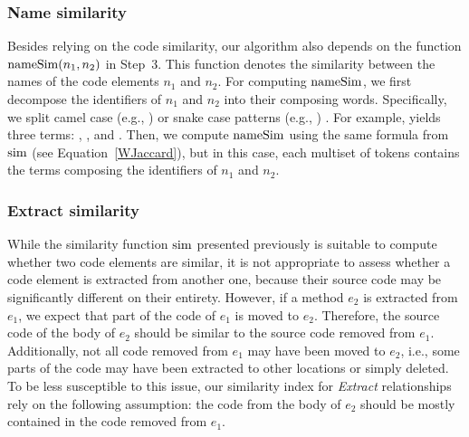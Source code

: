 \subsubsection{Name similarity}
\label{SecNameSim}

Besides relying on the code similarity, our algorithm also depends on the function $\operatorname{nameSim}(n_1, n_2)$ in Step~3.
This function denotes the similarity between the names of the code elements $n_1$ and $n_2$.
For computing $\operatorname{nameSim}$, we first decompose the identifiers of $n_1$ and $n_2$ into their composing words. Specifically, we split camel case (e.g., ) or snake case patterns (e.g., ) . For example,  yields three terms: , , and .
Then, we compute $\operatorname{nameSim}$ using the same formula from $\operatorname{sim}$ (see Equation~\ref{WJaccard}), but in this case, each multiset of tokens contains the terms composing the identifiers of $n_1$ and $n_2$.


\subsubsection{Extract similarity}
\label{SecSimX}

While the similarity function $\operatorname{sim}$ presented previously is suitable to compute whether two code elements are similar, it is not appropriate to assess whether a code element is extracted from another one, because their source code may be significantly different on their entirety.
However, if a method $e_2$ is extracted from $e_1$, we expect that part of the code of $e_1$ is moved to $e_2$.
Therefore, the source code of the body of $e_2$ should be similar to the source code removed from $e_1$.
Additionally, not all code removed from $e_1$ may have been moved to $e_2$, i.e., some parts of the code may have been extracted to other locations or simply deleted.
To be less susceptible to this issue, our similarity index for \textit{Extract} relationships rely on the following assumption: the code from the body of $e_2$ should be mostly contained in the code removed from $e_1$.


